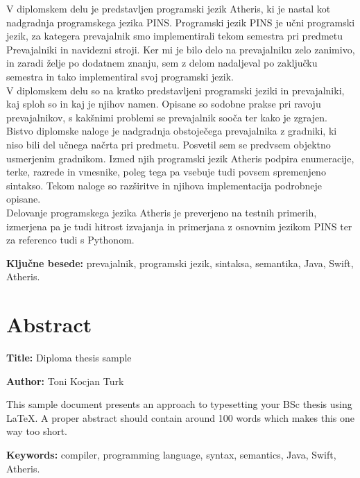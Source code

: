 \documentclass[a4paper, 12p]{book}
\newcommand{\ttitleEn}{Diploma thesis sample}
\newcommand{\tauthor}{Toni Kocjan Turk}
\newcommand{\tkeywords}{prevajalnik, programski jezik, sintaksa, semantika, Java, Swift, Atheris}
\newcommand{\tkeywordsEn}{compiler, programming language, syntax, semantics, Java, Swift, Atheris}
\newcommand{\clearemptydoublepage}{\newpage{\pagestyle{empty}\cleardoublepage}}
\begin{document}
V diplomskem delu je predstavljen programski jezik Atheris, ki je nastal kot nadgradnja programskega jezika PINS. Programski jezik PINS je učni programski jezik, za kategera prevajalnik smo implementirali tekom semestra pri predmetu Prevajalniki in navidezni stroji. Ker mi je bilo delo na prevajalniku zelo zanimivo, in zaradi želje po dodatnem znanju, sem z delom nadaljeval po zaključku semestra in tako implementiral svoj programski jezik. \\
\indent V diplomskem delu so na kratko predstavljeni programski jeziki in prevajalniki, kaj sploh so in kaj je njihov namen. Opisane so sodobne prakse pri ravoju prevajalnikov, s kakšnimi problemi se prevajalnik sooča ter kako je zgrajen. \\
\indent Bistvo diplomske naloge je nadgradnja obstoječega prevajalnika z gradniki, ki niso bili del učnega načrta pri predmetu. Posvetil sem se predvsem objektno usmerjenim gradnikom. Izmed njih programski jezik Atheris podpira enumeracije, terke, razrede in vmesnike, poleg tega pa vsebuje tudi povsem spremenjeno sintakso. Tekom naloge so razširitve in njihova implementacija podrobneje opisane. \\
\indent Delovanje programskega jezika Atheris je preverjeno na testnih primerih, izmerjena pa je tudi hitrost izvajanja in primerjana z osnovnim jezikom PINS ter za referenco tudi s Pythonom.

\noindent 

\bigskip

\noindent\textbf{Ključne besede:} \tkeywords.
\clearemptydoublepage

\chapter*{Abstract}

\noindent\textbf{Title:} \ttitleEn
\bigskip

\noindent\textbf{Author:} \tauthor
\bigskip

\noindent This sample document presents an approach to typesetting your BSc thesis using \LaTeX. 
A proper abstract should contain around 100 words which makes this one way too short.
\bigskip

\noindent\textbf{Keywords:} \tkeywordsEn.
\clearemptydoublepage
\end{document}
